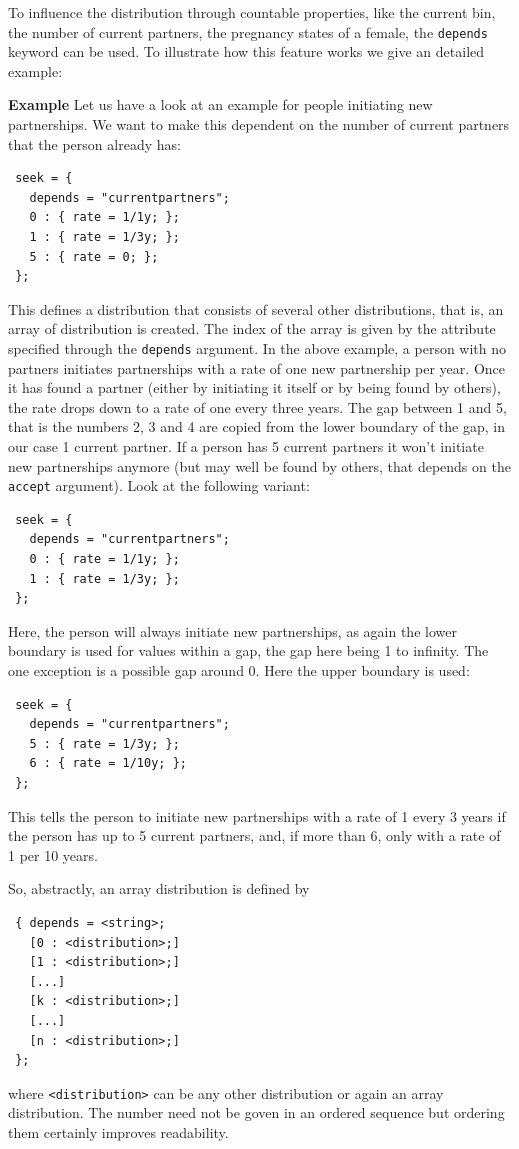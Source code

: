 \documentclass[11pt]{article}
\newenvironment{example}{\par\smallskip\noindent\begingroup\small\textbf{\small Example\enskip}}{\endgroup\par\smallskip}
\begin{document}
To influence the distribution through countable properties, like the current
bin, the number of current partners, the pregnancy states of a female, the
\texttt{depends} keyword can be used. To illustrate how this feature works we
give an detailed example:
\begin{example} 
Let us have a look at an example for people initiating new partnerships. We
want to make this dependent on the number of current partners that the person
already has:
\begin{verbatim}
 seek = {
   depends = "currentpartners";
   0 : { rate = 1/1y; };
   1 : { rate = 1/3y; };
   5 : { rate = 0; };
 };
\end{verbatim}
This defines a distribution that consists of several other distributions, that
is, an array of distribution is created. The index of the array is given by the
attribute specified through the \texttt{depends} argument. In the above
example, a person with no partners initiates partnerships with a rate of one
new partnership per year. Once it has found a partner (either by initiating
it itself or by being found by others), the rate drops down to a rate
of one every three years. The gap between 1 and 5, that is the numbers 2, 3 and
4 are copied from the lower boundary of the gap, in our case 1 current
partner. If a person has 5 current partners it won't initiate new partnerships
anymore (but may well be found by others, that depends on the \texttt{accept}
argument). Look at the following variant: 
\begin{verbatim}
 seek = {
   depends = "currentpartners";
   0 : { rate = 1/1y; };
   1 : { rate = 1/3y; };
 };
\end{verbatim}
Here, the person will always initiate new partnerships, as again the lower
boundary is used for values within a gap, the gap here being 1 to infinity.
The one exception is a possible gap around 0. Here the upper boundary is used:
\begin{verbatim}
 seek = {
   depends = "currentpartners";
   5 : { rate = 1/3y; };
   6 : { rate = 1/10y; };
 };
\end{verbatim}
This tells the person to initiate new partnerships with a rate of 1 every 3
years if the person has up to 5 current partners, and, if more than 6, only with
a rate of 1 per 10 years. 
\end{example}

So, abstractly, an array distribution is defined by 
\begin{verbatim}
 { depends = <string>;
   [0 : <distribution>;]
   [1 : <distribution>;]
   [...]
   [k : <distribution>;]
   [...]
   [n : <distribution>;]
 };
\end{verbatim}
where \texttt{<distribution>} can be any other distribution or again an array
distribution. The number need not be goven in an ordered sequence but ordering
them certainly improves readability.
\end{document}
